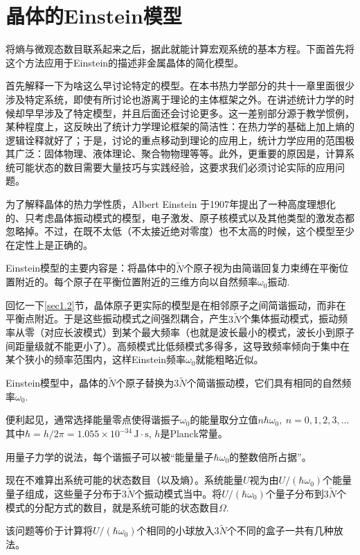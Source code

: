 \section{晶体的Einstein模型}
\label{sec15.2}
将熵与微观态数目联系起来之后，据此就能计算宏观系统的基本方程。下面首先将这个方法应用于Einstein的描述非金属晶体的简化模型。

首先解释一下为啥这么早讨论特定的模型。在本书热力学部分的共十一章里面很少涉及特定系统，即使有所讨论也游离于理论的主体框架之外。在讲述统计力学的时候却早早涉及了特定模型，并且后面还会讨论更多。这一差别部分源于教学惯例，某种程度上，这反映出了统计力学理论框架的简洁性：在热力学的基础上加上熵的逻辑诠释就好了；于是，讨论的重点移动到理论的应用上，统计力学应用的范围极其广泛：固体物理、液体理论、聚合物物理等等。此外，更重要的原因是，计算系统可能状态的数目需要大量技巧与实践经验，这要求我们必须讨论实际的应用问题。

为了解释晶体的热力学性质，Albert Einstein 于1907年提出了一种高度理想化的、只考虑晶体振动模式的模型，电子激发、原子核模式以及其他类型的激发态都忽略掉。不过，在既不太低（不太接近绝对零度）也不太高的时候，这个模型至少在定性上是正确的。

Einstein模型的主要内容是：将晶体中的$\tilde{N}$个原子视为由简谐回复力束缚在平衡位置附近的。每个原子在平衡位置附近的三维方向以自然频率$\omega_0$振动.

回忆一下\ref{sec1.2}节，晶体原子更实际的模型是在相邻原子之间简谐振动，而非在平衡点附近。于是这些振动模式之间强烈耦合，产生$3 \tilde{N}$个集体振动模式，振动频率从零（对应长波模式）到某个最大频率（也就是波长最小的模式，波长小到原子间距量级就不能更小了）。高频模式比低频模式多得多，这导致频率倾向于集中在某个狭小的频率范围内，这样Einstein频率$\omega_0$就能粗略近似。

Einstein模型中，晶体的$\tilde{N}$个原子替换为$3 \tilde{N}$个简谐振动模，它们具有相同的自然频率$\omega_0$.

便利起见，通常选择能量零点使得谐振子$\omega_0$的能量取分立值$n \hbar \omega_0,\ n = 0, 1, 2, 3, \dots$ 其中$\hbar = h / 2\pi = 1.055 \times 10^{-34} \, \mathrm{J \cdot s}$, $h$是Planck常量。

用量子力学的说法，每个谐振子可以被“能量量子$\hbar \omega_0$的整数倍所占据”。

现在不难算出系统可能的状态数目（以及熵）。系统能量$U$视为由$U / (\hbar \omega_0)$个能量量子组成，这些量子分布于$3 \tilde{N}$个振动模式当中。将$U / (\hbar \omega_0)$个量子分布到$3 \tilde{N}$个模式的分配方式的数目，就是系统可能的状态数目$\Omega$.

该问题等价于计算将$U/(\hbar \omega_0)$个相同的小球放入$3 \tilde{N}$个不同的盒子一共有几种放法。


